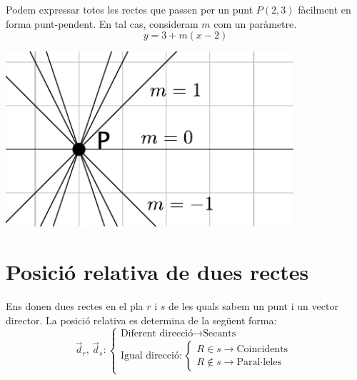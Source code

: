 \begin{theorybox}
    \begin{minipage}[t]{0.7\textwidth}
			Podem expressar totes les rectes que passen per un punt $P(2, 3)$ fàcilment en forma punt-pendent. En tal cas, consideram $m$ com un paràmetre.
			\[ y= 3+ m(x-2) \]
	\end{minipage}
	\begin{minipage}{0.3\textwidth}
		\centering
		\includegraphics[width=0.8\textwidth]{img-09/feix}
	\end{minipage}
	
	

\end{theorybox}

\section{Posició relativa de dues rectes}
\begin{theorybox}
	Ens donen dues rectes en el pla $r$ i $s$ de les quals sabem un punt i un vector director. La posició relativa es determina de la següent forma:
	\begin{equation}
		\vec d_r,\, \vec d_s : \left\{
		\begin{array}{l}
			\text{Diferent direcció} \rightarrow \text{Secants} \\
			\text{Igual direcció}:\left\{
			\begin{array}{l}
				R \in s \rightarrow \text{Coincidents} \\
				R \notin s \rightarrow \text{Paral·leles}
			\end{array}
			\right.
		\end{array}
		\right.
	\end{equation}
\end{theorybox}

